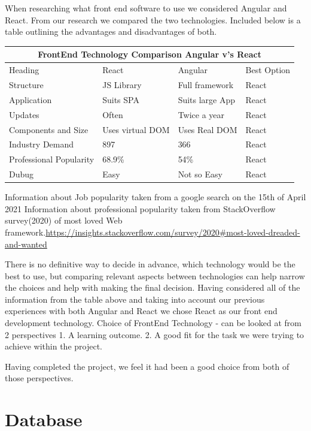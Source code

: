 When researching what front end software to use we considered Angular and React. From our research we compared the two technologies. Included below is a table outlining the advantages and disadvantages of both.
\begin{table}[ht]
\centering
\begin{tabular}{ |p{3cm}||p{3cm}|p{3cm}|p{3cm}| }
 \hline
 \multicolumn{4}{|c|}{FrontEnd Technology Comparison Angular v's React} \\

 \hline
 Heading& React& Angular&Best Option\\
 \hline
 Structure   & JS Library    &Full framework &  React\\
 Application & Suits SPA    & Suits large App   &React\\
 Updates &Often & Twice a year&  React\\
 Components and Size    &Uses virtual DOM & Uses Real DOM&  React\\
 Industry Demand&   897  & 366& React\\
 Professional Popularity& 68.9\% &54\%   &React\\
 Dubug& Easy& Not so Easy& React\\
 
 \hline
\end{tabular}
\end{table}

\hfill \break


Information about Job popularity taken from a google search on the 15th of April 2021
Information about professional popularity taken from StackOverflow survey(2020) of most loved Web framework.\url{https://insights.stackoverflow.com/survey/2020#most-loved-dreaded-and-wanted}


There is no definitive way to decide in advance, which technology would be the best to use, but comparing relevant aspects between technologies can help narrow the choices and help with making the final decision. Having considered all of the information from the table above and taking into account our previous experiences with both Angular and React we chose React as our front end development technology.
Choice of FrontEnd Technology - can be looked at from 2 perspectives 1. A learning outcome.
2. A good fit for the task we were trying to achieve within the project.

Having completed the project, we feel it had been a good choice from both of those perspectives. 
\section{Database}
